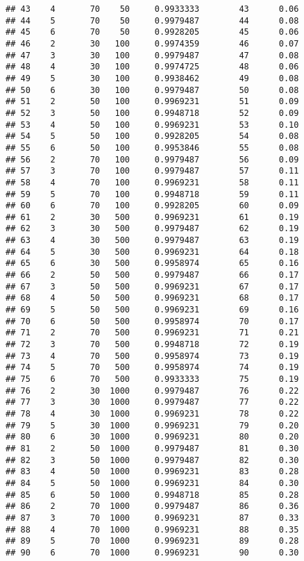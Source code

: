 \documentclass[
]{article}
\begin{document}
\begin{verbatim}
## 43    4       70    50     0.9933333        43      0.06
## 44    5       70    50     0.9979487        44      0.08
## 45    6       70    50     0.9928205        45      0.06
## 46    2       30   100     0.9974359        46      0.07
## 47    3       30   100     0.9979487        47      0.08
## 48    4       30   100     0.9974725        48      0.06
## 49    5       30   100     0.9938462        49      0.08
## 50    6       30   100     0.9979487        50      0.08
## 51    2       50   100     0.9969231        51      0.09
## 52    3       50   100     0.9948718        52      0.09
## 53    4       50   100     0.9969231        53      0.10
## 54    5       50   100     0.9928205        54      0.08
## 55    6       50   100     0.9953846        55      0.08
## 56    2       70   100     0.9979487        56      0.09
## 57    3       70   100     0.9979487        57      0.11
## 58    4       70   100     0.9969231        58      0.11
## 59    5       70   100     0.9948718        59      0.11
## 60    6       70   100     0.9928205        60      0.09
## 61    2       30   500     0.9969231        61      0.19
## 62    3       30   500     0.9979487        62      0.19
## 63    4       30   500     0.9979487        63      0.19
## 64    5       30   500     0.9969231        64      0.18
## 65    6       30   500     0.9958974        65      0.16
## 66    2       50   500     0.9979487        66      0.17
## 67    3       50   500     0.9969231        67      0.17
## 68    4       50   500     0.9969231        68      0.17
## 69    5       50   500     0.9969231        69      0.16
## 70    6       50   500     0.9958974        70      0.17
## 71    2       70   500     0.9969231        71      0.21
## 72    3       70   500     0.9948718        72      0.19
## 73    4       70   500     0.9958974        73      0.19
## 74    5       70   500     0.9958974        74      0.19
## 75    6       70   500     0.9933333        75      0.19
## 76    2       30  1000     0.9979487        76      0.22
## 77    3       30  1000     0.9979487        77      0.22
## 78    4       30  1000     0.9969231        78      0.22
## 79    5       30  1000     0.9969231        79      0.20
## 80    6       30  1000     0.9969231        80      0.20
## 81    2       50  1000     0.9979487        81      0.30
## 82    3       50  1000     0.9979487        82      0.30
## 83    4       50  1000     0.9969231        83      0.28
## 84    5       50  1000     0.9969231        84      0.30
## 85    6       50  1000     0.9948718        85      0.28
## 86    2       70  1000     0.9979487        86      0.36
## 87    3       70  1000     0.9969231        87      0.33
## 88    4       70  1000     0.9969231        88      0.35
## 89    5       70  1000     0.9969231        89      0.28
## 90    6       70  1000     0.9969231        90      0.30
\end{verbatim}
\end{document}

